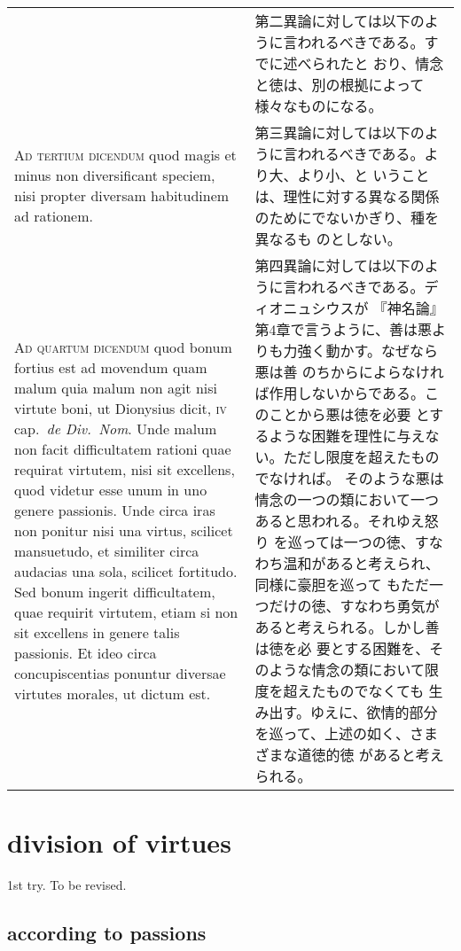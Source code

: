 \documentclass[10pt]{jsarticle}
\begin{document}
\begin{longtable}{p{21em}p{21em}}
&

 第二異論に対しては以下のように言われるべきである。すでに述べられたと
 おり、情念と徳は、別の根拠によって様々なものになる。
 
\\

 {\scshape Ad tertium dicendum} quod magis et minus non diversificant
 speciem, nisi propter diversam habitudinem ad rationem.
 
&

 第三異論に対しては以下のように言われるべきである。より大、より小、と
 いうことは、理性に対する異なる関係のためにでないかぎり、種を異なるも
 のとしない。
 
\\


 {\scshape Ad quartum dicendum} quod bonum fortius est ad movendum
 quam malum quia malum non agit nisi virtute boni, ut Dionysius dicit,
 {\scshape iv} cap.~{\itshape de Div.~Nom}. Unde malum non facit
 difficultatem rationi quae requirat virtutem, nisi sit excellens,
 quod videtur esse unum in uno genere passionis. Unde circa iras non
 ponitur nisi una virtus, scilicet mansuetudo, et similiter circa
 audacias una sola, scilicet fortitudo. Sed bonum ingerit
 difficultatem, quae requirit virtutem, etiam si non sit excellens in
 genere talis passionis. Et ideo circa concupiscentias ponuntur
 diversae virtutes morales, ut dictum est.
 
&

 第四異論に対しては以下のように言われるべきである。ディオニュシウスが
 『神名論』第4章で言うように、善は悪よりも力強く動かす。なぜなら悪は善
 のちからによらなければ作用しないからである。このことから悪は徳を必要
 とするような困難を理性に与えない。ただし限度を超えたものでなければ。
 そのような悪は情念の一つの類において一つあると思われる。それゆえ怒り
 を巡っては一つの徳、すなわち温和があると考えられ、同様に豪胆を巡って
 もただ一つだけの徳、すなわち勇気があると考えられる。しかし善は徳を必
 要とする困難を、そのような情念の類において限度を超えたものでなくても
 生み出す。ゆえに、欲情的部分を巡って、上述の如く、さまざまな道徳的徳
 があると考えられる。

\end{longtable}


\newpage

\section{division of virtues}
1st try. To be revised.
\subsection{according to passions}
\schema
{}
{
    {}
    {
	\schema
	{}
	{}
    }
}
\end{document}
